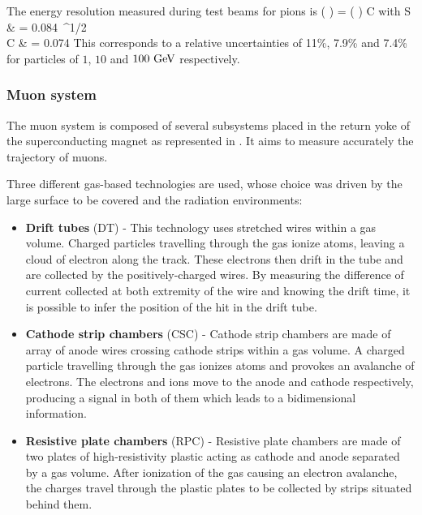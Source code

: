     The energy resolution measured during test beams for pions is
    {
        \left(  \right)
        =
        \left(  \right)
        \oplus
        C
    }
    with
    {
        S & = 0.084~^{1/2} \\
        C & = 0.074\nonumber
    }
    This corresponds to a relative uncertainties of 11\%, 7.9\% and 7.4\% for particles
    of $1$, $10$ and $100~\text{GeV}$ respectively.

        \subsubsection{Muon system}

    The muon system is composed of several subsystems placed in the return yoke of
    the superconducting magnet as represented in . It aims to
    measure accurately the trajectory of muons.


    Three different gas-based technologies are used, whose choice was driven by the
    large surface to be covered and the radiation environments:
    \begin{itemize}
        \item \textbf{Drift tubes} (DT) - This technology uses stretched wires within
            a gas volume. Charged particles travelling through the gas ionize atoms,
            leaving a cloud of electron along the track. These electrons then drift
            in the tube and are collected by the positively-charged wires. By measuring
            the difference of current collected at both extremity of the wire and knowing
            the drift time, it is possible to infer the position of the hit in the drift
            tube.
        \item \textbf{Cathode strip chambers} (CSC) - Cathode strip chambers are
            made of array of anode wires crossing cathode strips within a gas volume.
            A charged particle travelling through the gas ionizes atoms and provokes an
            avalanche of electrons. The electrons and ions move to the anode and
            cathode respectively, producing a signal in both of them which leads to
            a bidimensional information.
        \item \textbf{Resistive plate chambers} (RPC) - Resistive plate chambers are
            made of two plates of high-resistivity plastic acting as cathode and anode
            separated by a gas volume. After ionization of the gas causing an
            electron avalanche, the charges travel through the plastic plates to be
            collected by strips situated behind them.
    \end{itemize}

